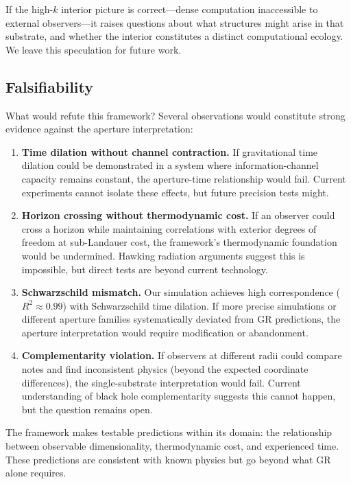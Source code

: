 \documentclass[11pt,a4paper]{article}
\begin{document}
If the high-$k$ interior picture is correct---dense computation inaccessible to external observers---it raises questions about what structures might arise in that substrate, and whether the interior constitutes a distinct computational ecology. We leave this speculation for future work.

\subsection{Falsifiability}

What would refute this framework? Several observations would constitute strong evidence against the aperture interpretation:

\begin{enumerate}
    \item \textbf{Time dilation without channel contraction.} If gravitational time dilation could be demonstrated in a system where information-channel capacity remains constant, the aperture-time relationship would fail. Current experiments cannot isolate these effects, but future precision tests might.

    \item \textbf{Horizon crossing without thermodynamic cost.} If an observer could cross a horizon while maintaining correlations with exterior degrees of freedom at sub-Landauer cost, the framework's thermodynamic foundation would be undermined. Hawking radiation arguments suggest this is impossible, but direct tests are beyond current technology.

    \item \textbf{Schwarzschild mismatch.} Our simulation achieves high correspondence ($R^2 \approx 0.99$) with Schwarzschild time dilation. If more precise simulations or different aperture families systematically deviated from GR predictions, the aperture interpretation would require modification or abandonment.

    \item \textbf{Complementarity violation.} If observers at different radii could compare notes and find inconsistent physics (beyond the expected coordinate differences), the single-substrate interpretation would fail. Current understanding of black hole complementarity suggests this cannot happen, but the question remains open.
\end{enumerate}

The framework makes testable predictions within its domain: the relationship between observable dimensionality, thermodynamic cost, and experienced time. These predictions are consistent with known physics but go beyond what GR alone requires.
\end{document}
